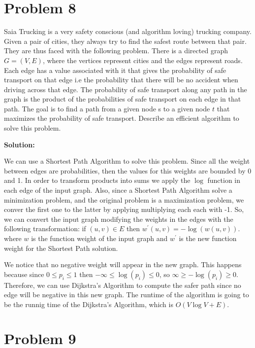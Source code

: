 \documentclass[a4paper, 11pt]{article}
\newcommand{\solution}{\textbf{Solution:}}
\begin{document}
\section*{Problem 8}

Saia Trucking is a very safety conscious (and algorithm loving) trucking company. Given a pair of cities, they always try to find the safest route between that pair. They are thus faced with the following problem.
There is a directed graph $G = (V,E)$, where the vertices represent cities and the edges represent roads. Each edge has a value associated with it that gives the probability of safe transport on that edge i.e the probability that there will be no accident when driving across that edge. The probability of safe transport along any path in the graph is the product of the probabilities of safe transport on each edge in that path.
The goal is to find a path from a given node s to a given node $t$ that maximizes the probability of safe transport. Describe an efficient algorithm to solve this problem.

\solution

We can use a Shortest Path Algorithm to solve this problem. Since all the weight between edges are probabilities, then the values for this weights are bounded by 0 and 1. In order to transform products into sums we apply the $\log$ function in each edge of the input graph. Also, since a Shortest Path Algorithm solve a minimization problem, and the original problem is a maximization problem, we conver the first one to the latter by applying multiplying each each with -1. So, we can convert the input graph modifying the weights in the edges with the following transformation: if $(u, v) \in E$ then $w^{'}(u, v) = - \log (w(u, v))$. where $w$ is the function weight of the input graph and $w^{'}$ is the new function weight for the Shortest Path solution.

We notice that no negative weight will appear in the new graph. This happens because since $0 \leq p_i \leq 1$ then $- \infty \leq \log(p_i) \leq 0$, so $\infty \geq - \log (p_i) \geq 0$. Therefore, we can use Dijkstra's Algorithm to compute the safer path since no edge will be negative in this new graph. The runtime of the algorithm is going to be the runnig time of the Dijkstra's Algorithm, which is $O(V \log V + E)$.

\section*{Problem 9}
\end{document}
